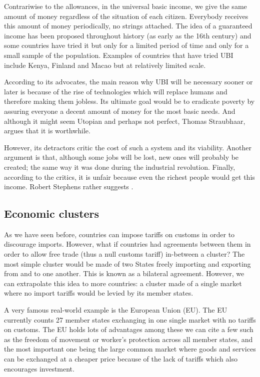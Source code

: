     Contrariwise to the allowances, in the universal basic income, we give the same amount of money regardless of the situation of each citizen. Everybody receives this amount of money periodically, no strings attached. The idea of a guaranteed income has been proposed throughout history (as early as the 16th century) and some countries have tried it but only for a limited period of time and only for a small sample of the population. Examples of countries that have tried UBI include Kenya, Finland and Macao but at relatively limited scale. 
    
    According to its advocates, the main reason why UBI will be necessary sooner or later is because of the rise of technologies which will replace humans and therefore making them jobless. Its ultimate goal would be to eradicate poverty by assuring everyone a decent amount of money for the most basic needs. And although it might seem Utopian and perhaps not perfect, Thomas Straubhaar, argues that it is worthwhile.\cite{straubhaar2017economics}
    
    However, its detractors critic the cost of such a system and its viability. Another argument is that, although some jobs will be lost, new ones will probably be created; the same way it was done during the industrial revolution. Finally, according to the critics, it is unfair because even the richest people would get this income. Robert Stephens rather suggests  \cite{stephens2019universal}.

    
\subsection{Economic clusters}
    As we have seen before, countries can impose tariffs on customs in order to discourage imports. However, what if countries had agreements between them in order to allow free trade (thus a null customs tariff) in-between a cluster? The most simple cluster would be made of two States freely importing and exporting from and to one another. This is known as a bilateral agreement. However, we can extrapolate this idea to more countries: a cluster made of a single market where no import tariffs would be levied by its member states.
    
    A very famous real-world example is the European Union (EU). The EU currently counts 27 member states exchanging in one single market with no tariffs on customs. The EU holds lots of advantages among these we can cite a few such as the freedom of movement or worker's protection across all member states, and the most important one being the large common market where goods and services can be exchanged at a cheaper price because of the lack of tariffs which also encourages investment.
    
